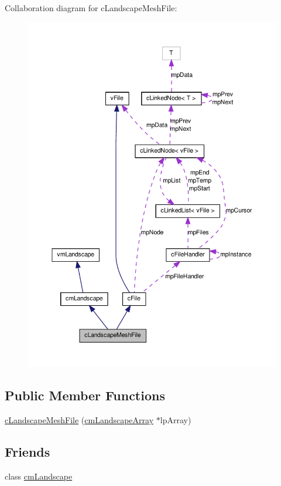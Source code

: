 Collaboration diagram for cLandscapeMeshFile:
\nopagebreak
\begin{figure}[H]
\begin{center}
\leavevmode
\includegraphics[width=400pt]{classc_landscape_mesh_file__coll__graph}
\end{center}
\end{figure}
\subsection*{Public Member Functions}
\begin{DoxyCompactItemize}
\item 
\hyperlink{classc_landscape_mesh_file_ab7ed7f355cc4b40107dcea5bb9db110a}{cLandscapeMeshFile} (\hyperlink{classcm_landscape_array}{cmLandscapeArray} $\ast$lpArray)
\end{DoxyCompactItemize}
\subsection*{Friends}
\begin{DoxyCompactItemize}
\item 
class \hyperlink{classc_landscape_mesh_file_a642b5e78056302f99f656983a53beb6d}{cmLandscape}
\end{DoxyCompactItemize}


